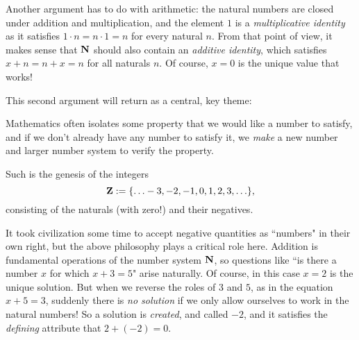 \documentclass[11pt,oneside]{amsart}
\begin{document}
Another argument has to do with arithmetic: the natural numbers are closed under 
addition and multiplication, and the element $1$ is a 
{\em multiplicative identity} as it satisfies $1\cdot n=n\cdot 1=n$ for every 
natural $n$.  From that point of view, it makes sense that $\mathbf{N}$ should also 
contain an {\em additive identity}, which satisfies $x + n = n + x = n$ for 
all naturals $n$.  Of course, $x=0$ is the unique value that works!

This second argument will return as a central, key theme: 
\begin{philosophy}
	Mathematics often isolates some property that we would like a number to 
  satisfy, and if we don't already have any number to satisfy it, we {\em make} 
  a new number and larger number system to verify the property. 
\end{philosophy}

Such is the genesis of the integers
\[\mathbf{Z}:=\{\ldots -3,-2,-1,0,1,2,3,\ldots\},\]
consisting of the naturals (with zero!) and their negatives.

It took civilization some time to accept negative quantities as ``numbers" in 
their own right, but the above philosophy plays a critical role here.  
Addition is fundamental operations of the number system $\mathbf{N}$,
so questions like ``is there a number $x$ for which $x+3=5$" arise naturally.  
Of course, in this case $x=2$ is the unique solution.
But when we reverse the roles of $3$ and $5$, as in the equation $x+5=3$, 
suddenly there is {\em no solution} if we only allow ourselves to 
work in the natural numbers!  So a solution is {\em created}, and called $-2$, 
and it satisfies the {\em defining} attribute that $2 + (-2) = 0$.
\end{document}
